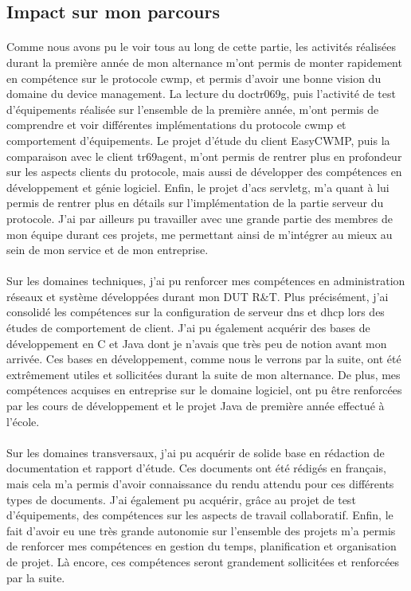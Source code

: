 \documentclass[12pt,a4paper]{report}
\begin{document}
\subsection{Impact sur mon parcours}
\paragraph*{}Comme nous avons pu le voir tous au long de cette partie, les activités réalisées durant la première année de mon alternance m'ont permis de monter rapidement en compétence sur le protocole \gls{cwmp}, et permis d'avoir une bonne vision du domaine du device management. La lecture du \gls{doctr069g}, puis l'activité de test d'équipements réalisée sur l'ensemble de la première année, m'ont permis de comprendre et voir différentes implémentations du protocole \gls{cwmp} et comportement d'équipements. Le projet d'étude du client EasyCWMP, puis la comparaison avec le client tr69agent, m'ont permis de rentrer plus en profondeur sur les aspects clients du protocole, mais aussi de développer des compétences en développement et génie logiciel. Enfin, le projet d'\gls{acs} \gls{servletg}, m'a quant à lui permis de rentrer plus en détails sur l'implémentation de la partie serveur du protocole. J'ai par ailleurs pu travailler avec une grande partie des membres de mon équipe durant ces projets, me permettant ainsi de m'intégrer au mieux au sein de mon service et de mon entreprise. 
\paragraph*{}Sur les domaines techniques, j'ai pu renforcer mes compétences en administration réseaux et système développées durant mon DUT R\&T. Plus précisément, j'ai consolidé les compétences sur la configuration de serveur \gls{dns} et \gls{dhcp} lors des études de comportement de client. J'ai pu également acquérir des bases de développement en C et Java dont je n'avais que très peu de notion avant mon arrivée. Ces bases en développement, comme nous le verrons par la suite, ont été extrêmement utiles et sollicitées durant la suite de mon alternance. De plus, mes compétences acquises en entreprise sur le domaine logiciel, ont pu être renforcées par les cours de développement et le projet Java de première année effectué à l'école. 
\paragraph*{}Sur les domaines transversaux, j'ai pu acquérir de solide base en rédaction de documentation et rapport d'étude. Ces documents ont été rédigés en français, mais cela m'a permis d'avoir connaissance du rendu attendu pour ces différents types de documents. J'ai également pu acquérir, grâce au projet de test d'équipements, des compétences sur les aspects de travail collaboratif. Enfin, le fait d'avoir eu une très grande autonomie sur l'ensemble des projets m'a permis de renforcer mes compétences en gestion du temps, planification et organisation de projet. Là encore, ces compétences seront grandement sollicitées et renforcées par la suite.
\end{document}
